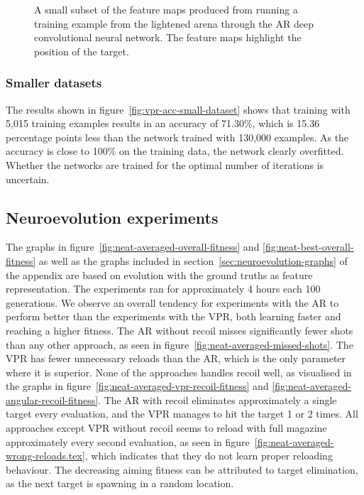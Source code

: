 \begin{figure}[H]
	\begin{scriptsize}
		\sffamily
		\def\svgwidth{\textwidth}
		
	\end{scriptsize}
	\caption[Feature maps for the CNN using AR]{A small subset of the feature maps produced from running a training example from the lightened arena through the AR deep convolutional neural network. The feature maps highlight the position of the target.}
	\label{fig:featuremapsangular}
\end{figure}

\subsubsection{Smaller datasets}
The results shown in figure~\ref{fig:vpr-acc-small-dataset} shows that training with 5,015 training examples results in an accuracy of 71.30\%, which is 15.36 percentage points less than the network trained with 130,000 examples. As the accuracy is close to 100\% on the training data, the network clearly overfitted. Whether the networks are trained for the optimal number of iterations is uncertain.



\subsection{Neuroevolution experiments}
\label{sec:neuroevolution-experiments-results}
The graphs in figure~\ref{fig:neat-averaged-overall-fitness} and \ref{fig:neat-best-overall-fitness} as well as the graphs included in section~\ref{sec:neuroevolution-graphs} of the appendix are based on evolution with the ground truths as feature representation. The experiments ran for approximately 4 hours each 100 generations. We observe an overall tendency for experiments with the AR to perform better than the experiments with the VPR, both learning faster and reaching a higher fitness. The AR without recoil misses significantly fewer shots than any other approach, as seen in figure~\ref{fig:neat-averaged-missed-shots}. The VPR has fewer unnecessary reloads than the AR, which is the only parameter where it is superior. None of the approaches handles recoil well, as visualised in the graphs in figure~\ref{fig:neat-averaged-vpr-recoil-fitness} and \ref{fig:neat-averaged-angular-recoil-fitness}. The AR with recoil eliminates approximately a single target every evaluation, and the VPR manages to hit the target 1 or 2 times. All approaches except VPR without recoil seems to reload with full magazine approximately every second evaluation, as seen in figure~\ref{fig:neat-averaged-wrong-reloads.tex}, which indicates that they do not learn proper reloading behaviour. The decreasing aiming fitness can be attributed to target elimination, as the next target is spawning in a random location.


